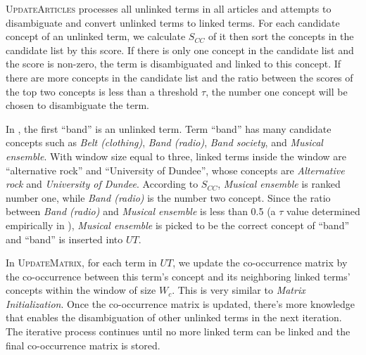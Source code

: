 \textsc{UpdateArticles} processes all unlinked terms in all articles
and attempts to disambiguate and convert unlinked terms
to linked terms.
For each candidate concept of an unlinked term,
we calculate $S_{CC}$ of it then sort the
concepts in the candidate list by this score.
If there is only one concept in the candidate list and
the score is non-zero, the term is disambiguated and linked to this concept.
If there are more concepts in the candidate list and the ratio between
the scores of the top two concepts is less than a threshold $\tau$,
the number one concept will be chosen to disambiguate the term.

In , the first ``band'' is an unlinked term.
Term ``band'' has many candidate concepts such as
\emph{Belt (clothing)}, \emph{Band (radio)}, \emph{Band society}, and
\emph{Musical ensemble}.
With window size equal to three, linked terms inside the window are
``alternative rock'' and ``University of Dundee'',
whose concepts are \emph{Alternative rock} and \emph{University of Dundee}.
According to $S_{CC}$, \emph{Musical ensemble} is ranked number one,
while \emph{Band (radio)} is the number two concept.
Since the ratio between \emph{Band (radio)} and \emph{Musical ensemble} is less
than 0.5 (a $\tau$ value determined empirically in ),
\emph{Musical ensemble} is picked to be the correct concept of ``band'' and
``band'' is inserted into $UT$.

In \textsc{UpdateMatrix}, for each term in $UT$,
we update the co-occurrence matrix by the co-occurrence between
this term's concept and its neighboring linked terms' concepts within the window of size $W_c$. This is
very similar to {\em Matrix Initialization}.
Once the co-occurrence matrix is updated, there's more knowledge that enables
the disambiguation of other unlinked terms in the next iteration.
The iterative process continues until no more linked term can be linked
and the final co-occurrence matrix is stored.

